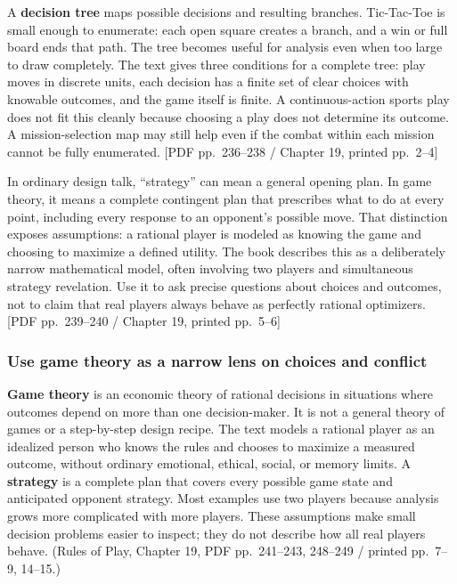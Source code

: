 A \textbf{decision tree} maps possible decisions and resulting branches. Tic-Tac-Toe is small enough to enumerate: each open square creates a branch, and a win or full board ends that path. The tree becomes useful for analysis even when too large to draw completely. The text gives three conditions for a complete tree: play moves in discrete units, each decision has a finite set of clear choices with knowable outcomes, and the game itself is finite. A continuous-action sports play does not fit this cleanly because choosing a play does not determine its outcome. A mission-selection map may still help even if the combat within each mission cannot be fully enumerated. {[}PDF pp.~236--238 / Chapter 19, printed pp.~2--4{]}

In ordinary design talk, ``strategy'' can mean a general opening plan. In game theory, it means a complete contingent plan that prescribes what to do at every point, including every response to an opponent's possible move. That distinction exposes assumptions: a rational player is modeled as knowing the game and choosing to maximize a defined utility. The book describes this as a deliberately narrow mathematical model, often involving two players and simultaneous strategy revelation. Use it to ask precise questions about choices and outcomes, not to claim that real players always behave as perfectly rational optimizers. {[}PDF pp.~239--240 / Chapter 19, printed pp.~5--6{]}

\subsubsection{Use game theory as a narrow lens on choices and conflict}\label{05-engine-i-ch009-use-game-theory-as-a-narrow-lens-on-choices-and-conflict}

\textbf{Game theory} is an economic theory of rational decisions in situations where outcomes depend on more than one decision-maker. It is not a general theory of games or a step-by-step design recipe. The text models a rational player as an idealized person who knows the rules and chooses to maximize a measured outcome, without ordinary emotional, ethical, social, or memory limits. A \textbf{strategy} is a complete plan that covers every possible game state and anticipated opponent strategy. Most examples use two players because analysis grows more complicated with more players. These assumptions make small decision problems easier to inspect; they do not describe how all real players behave. (Rules of Play, Chapter 19, PDF pp.~241--243, 248--249 / printed pp.~7--9, 14--15.)

